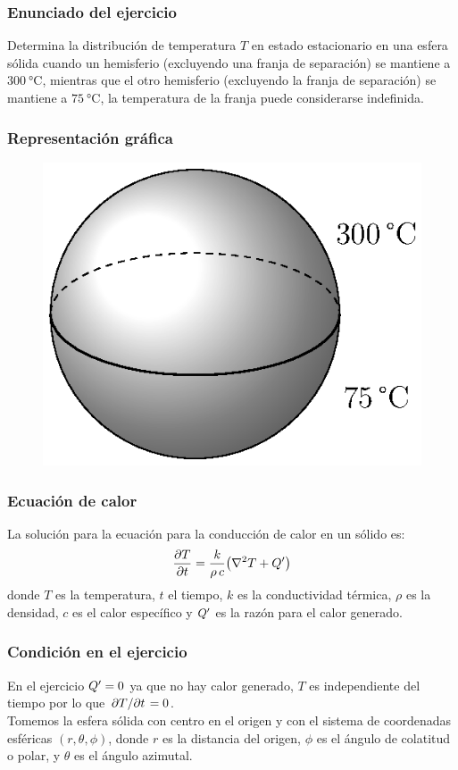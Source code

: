 \documentclass[12pt]{beamer}
\begin{document}
\begin{frame}
\frametitle{Enunciado del ejercicio}
Determina la distribución de temperatura $T$ en estado estacionario en una esfera sólida cuando un hemisferio (excluyendo una franja de separación) se mantiene a $\SI{300}{\degreeCelsius}$, \pause mientras que el otro hemisferio (excluyendo la franja de separación) se mantiene a $\SI{75}{\degreeCelsius}$, \pause la temperatura de la franja puede considerarse indefinida.
\end{frame}
\begin{frame}
\frametitle{Representación gráfica}
\begin{figure}
    \centering
    \includegraphics[scale=1.2]{Imagenes/esfera_Clase_19.eps}
\end{figure}
\end{frame}
\begin{frame}
\frametitle{Ecuación de calor}
La solución para la ecuación para la conducción de calor en un sólido es:
\pause
\begin{align}
\pdv{T}{t} = \dfrac{k}{\rho \, c} \big( \laplacian{T} + \pderivada{Q} \big)
\label{eq:ecuacion_9_01}
\end{align}
donde $T$ es la temperatura, $t$ el tiempo, $k$ es la conductividad térmica, $\rho$ es la densidad, $c$ es el calor específico y ${Q}^{\prime}$ es la razón para el calor generado.
\end{frame}
\begin{frame}
\frametitle{Condición en el ejercicio}
En el ejercicio ${Q}^{\prime} = 0$ ya que no hay calor generado, \pause $T$ es independiente del tiempo por lo que $\pdv*{T}{t} = 0$.
\\
\bigskip
\pause
Tomemos la esfera sólida con centro en el origen y con el sistema de coordenadas esféricas $(r, \theta, \phi)$, donde $r$ es la distancia del origen, $\phi$ es el ángulo de colatitud o polar, y $\theta$ es el ángulo azimutal.
\end{frame}
\end{document}
